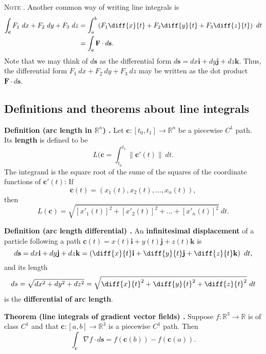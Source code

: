 \textsc{Note \cite{marsden_vector_calculus}}. Another common way of writing line integrals is
\begin{align*}
\int_{\mathbf{c}} F_1 \ dx + F_2 \ dy + F_3 \ dz &= \int_a^b \left( F_1 \diff{x}{t} + F_2 \diff{y}{t} + F_3 \diff{z}{t} \right) \ dt \\
&= \int_{\mathbf{c}} \mathbf{F} \cdot d \mathbf{s} .
\end{align*}
Note that we may think of $d \mathbf{s}$ as the differential form $d \mathbf{s} = dx \mathbf{i} + dy \mathbf{j} + dz \mathbf{k}$. Thus, the differential form $F_1 \ dx + F_2 \ dy + F_3 \ dz$ may be written as the dot product $\mathbf{F} \cdot d \mathbf{s}$.

\subsection{Definitions and theorems about line integrals}

\begin{shaded}
\textbf{Definition (arc length in $\mathbb{R}^n$) \cite{marsden_vector_calculus}.} Let $\mathbf{c}: [t_0, t_1] \to \mathbb{R}^n$ be a piecewise $C^1$ path. Its \textbf{length} is defined to be
$$ L(\mathbf{c} = \int_{t_0}^{t_1} \lVert \mathbf{c}'(t) \rVert \ dt . $$
The integrand is the square root of the sume of the squares of the coordinate functions of $\mathbf{c}'(t)$: If
$$ \mathbf{c}(t) = (x_1(t), x_2(t), ..., x_n(t)) , $$
then
$$ L(\mathbf{c}) = \sqrt{[x'_1(t)]^2 + [x'_2(t)]^2 + ... + [x'_n(t)]^2} \ dt . $$
\end{shaded}

\begin{shaded}
\textbf{Definition (arc length differential) \cite{marsden_vector_calculus}.} An \textbf{infinitesimal displacement} of a particle following a path $\mathbf{c}(t) = x(t) \mathbf{i} + y(t) \mathbf{j} + z(t) \mathbf{k}$ is
$$ d \mathbf{s} = dx \mathbf{i} + dy \mathbf{j} + dz \mathbf{k} = \left( \diff{x}{t} \mathbf{i} + \diff{y}{t} \mathbf{j} + \diff{z}{t} \mathbf{k} \right) \ dt , $$
and its length
$$ ds = \sqrt{dx^2 + dy^2 + dz^2} = \sqrt{{\diff{x}{t}}^2 + {\diff{y}{t}}^2 + {\diff{z}{t}}^2} \ dt $$
is the \textbf{differential of arc length}.
\end{shaded}

\begin{shaded}
\textbf{Theorem (line integrals of gradient vector fields) \cite{marsden_vector_calculus}.} Suppose $f : \mathbb{R}^3 \to \mathbb{R}$ is of class $C^1$ and that $\mathbf{c} : [a, b] \to \mathbb{R}^3$ is a piecewise $C^1$ path. Then
$$ \int_{\mathbf{c}} \nabla f \cdot d\mathbf{s} = f(\mathbf{c}(b)) - f(\mathbf{c}(a)) . $$
\end{shaded}

